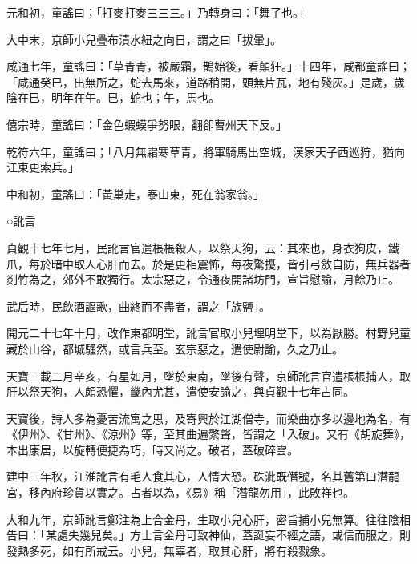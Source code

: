 \begin{pinyinscope}
 元和初，童謠曰；「打麥打麥三三三。」乃轉身曰：「舞了也。」



 大中末，京師小兒疊布漬水紐之向日，謂之曰「拔暈」。



 咸通七年，童謠曰：「草青青，被嚴霜，鵲始後，看顛狂。」十四年，咸都童謠曰；「咸通癸巳，出無所之，蛇去馬來，道路稍開，頭無片瓦，地有殘灰。」是歲，歲陰在巳，明年在午。巳，蛇也；午，馬也。



 僖宗時，童謠曰：「金色蝦蟆爭努眼，翻卻曹州天下反。」



 乾符六年，童謠曰；「八月無霜寒草青，將軍騎馬出空城，漢家天子西巡狩，猶向江東更索兵。」



 中和初，童謠曰：「黃巢走，泰山東，死在翁家翁。」



 ○訛言



 貞觀十七年七月，民訛言官遣棖棖殺人，以祭天狗，云：其來也，身衣狗皮，鐵爪，每於暗中取人心肝而去。於是更相震怖，每夜驚擾，皆引弓斂自防，無兵器者剡竹為之，郊外不敢獨行。太宗惡之，令通夜開諸坊門，宣旨慰諭，月餘乃止。



 武后時，民飲酒謳歌，曲終而不盡者，謂之「族鹽」。



 開元二十七年十月，改作東都明堂，訛言官取小兒埋明堂下，以為厭勝。村野兒童藏於山谷，都城騷然，或言兵至。玄宗惡之，遣使尉諭，久之乃止。



 天寶三載二月辛亥，有星如月，墜於東南，墜後有聲，京師訛言官遣棖棖捕人，取肝以祭天狗，人頗恐懼，畿內尤甚，遣使安諭之，與貞觀十七年占同。



 天寶後，詩人多為憂苦流寓之思，及寄興於江湖僧寺，而樂曲亦多以邊地為名，有《伊州》、《甘州》、《涼州》等，至其曲遍繁聲，皆謂之「入破」。又有《胡旋舞》，本出康居，以旋轉便捷為巧，時又尚之。破者，蓋破碎雲。



 建中三年秋，江淮訛言有毛人食其心，人情大恐。硃泚既僭號，名其舊第曰潛龍宮，移內府珍貨以實之。占者以為，《易》稱「潛龍勿用」，此敗祥也。



 大和九年，京師訛言鄭注為上合金丹，生取小兒心肝，密旨捕小兒無算。往往陰相告曰：「某處失幾兒矣。」方士言金丹可致神仙，蓋誕妄不經之語，或信而服之，則發熱多死，如有所戒云。小兒，無辜者，取其心肝，將有殺戮象。




\end{pinyinscope}
